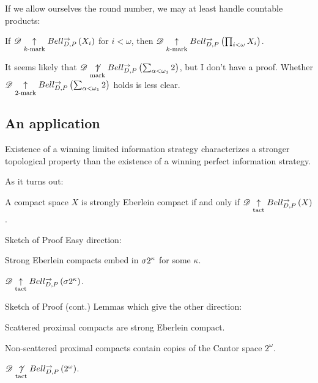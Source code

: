 \documentclass{beamer}
\theoremstyle{definition}
\begin{document}
\begin{frame}
  If we allow ourselves the round number, we may at least handle countable
  products:

  \begin{theorem}
    If $\mathscr{D}\underset{k\text{-mark}}{\uparrow}Bell_{D,P}^{\to}\left({X_i}\right)$ for $i<\omega$,
    then $\mathscr{D}\underset{k\text{-mark}}{\uparrow}Bell_{D,P}^{\to}\left({\prod_{i<\omega} X_i}\right)$.
  \end{theorem}

  It seems likely that
  $\mathscr{D}\underset{\text{mark}}{\not\uparrow}Bell_{D,P}^{\to}\left({\sum_{\alpha<\omega_1} 2}\right)$,
  but I don't have a proof. Whether
  $\mathscr{D}\underset{2\text{-mark}}{\uparrow}Bell_{D,P}^{\to}\left({\sum_{\alpha<\omega_1} 2}\right)$
  holds is less clear.
\end{frame}

\subsection{An application}

\begin{frame}
  Existence of a winning limited information strategy characterizes a
  stronger topological property than the existence of a winning perfect
  information strategy.

  \vpause

  As it turns out:

  \begin{theorem}
    A compact space $X$ is strongly Eberlein compact if and only if
    $\mathscr{D}\underset{\text{tact}}{\uparrow}Bell_{D,P}^{\to}\left({X}\right)$.
  \end{theorem}
\end{frame}

\begin{frame}{Sketch of Proof}
  Easy direction:

  \begin{definition}
    Strong Eberlein compacts embed in $\sigma2^{\kappa}$ for
    some $\kappa$.
  \end{definition}

  \begin{lemma}
    $\mathscr{D}\underset{\text{tact}}{\uparrow}Bell_{D,P}^{\to}\left({\sigma2^{\kappa}}\right)$.
  \end{lemma}
\end{frame}

\begin{frame}{Sketch of Proof (cont.)}
  Lemmas which give the other direction:

  \begin{lemma}
    Scattered proximal compacts are strong Eberlein compact.
  \end{lemma}

  \begin{lemma}
    Non-scattered proximal compacts contain copies of the Cantor space
    $2^\omega$.
  \end{lemma}

  \begin{lemma}
    $\mathscr{D}\underset{\text{tact}}{\not\uparrow}Bell_{D,P}^{\to}\left({2^\omega}\right)$.
  \end{lemma}
\end{frame}
\end{document}
